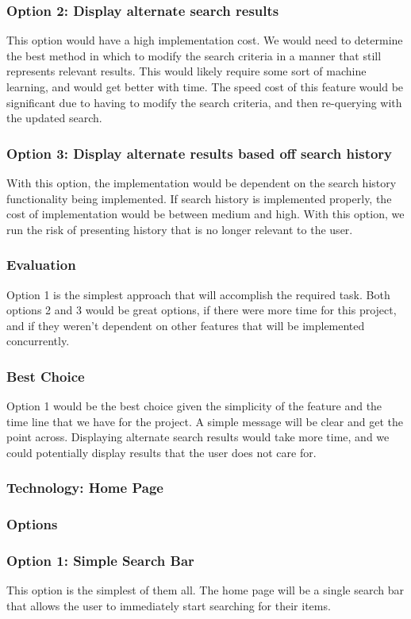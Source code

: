 \documentclass[journal,compsoc, 10pt, draftclsnofoot, onecolumn]{IEEEtran}
\begin{document}
\subsubsection*{Option 2: Display alternate search results}
This option would have a high implementation cost. We would need to determine 
the best method in which to modify the search criteria in a manner that still 
represents relevant results. This would likely require some sort of machine 
learning, and would get better with time. The speed cost of this feature would 
be significant due to having to modify the search criteria, and then 
re-querying with the updated search.
\subsubsection*{Option 3: Display alternate results based off search history}
With this option, the implementation would be dependent on the search history 
functionality being implemented. If search history is implemented properly, 
the cost of implementation would be between medium and high. With this option, 
we run the risk of presenting history that is no longer relevant to the user. 
\subsubsection*{Evaluation}
Option 1 is the simplest approach that will accomplish the required task. Both 
options 2 and 3 would be great options, if there were more time for this project, 
and if they weren't dependent on other features that will be implemented concurrently.
\subsubsection*{Best Choice}
Option 1 would be the best choice given the simplicity of the feature and the 
time line that we have for the project. A simple message will be clear and get 
the point across. Displaying alternate search results would take more time, 
and we could potentially display results that the user does not care for.

\subsubsection{Technology: Home Page}
\subsubsection*{Options}
\subsubsection*{Option 1: Simple Search Bar}
This option is the simplest of them all. The home page will be a single search 
bar that allows the user to immediately start searching for their items. 
\end{document}

